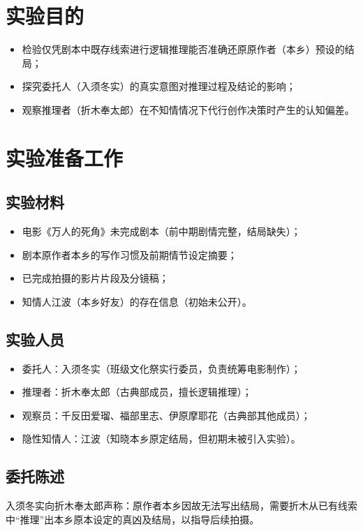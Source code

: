 \documentclass[a3paper, twocolumn]{article}
\begin{document}
\maketitle

\section{实验目的}
\begin{itemize}
    \item 检验仅凭剧本中既存线索进行逻辑推理能否准确还原原作者（本乡）预设的结局；
    \item 探究委托人（入须冬实）的真实意图对推理过程及结论的影响；
    \item 观察推理者（折木奉太郎）在不知情情况下代行创作决策时产生的认知偏差。
\end{itemize}

\section{实验准备工作}
\subsection{实验材料}
\begin{itemize}
    \item 电影《万人的死角》未完成剧本（前中期剧情完整，结局缺失）；
    \item 剧本原作者本乡的写作习惯及前期情节设定摘要；
    \item 已完成拍摄的影片片段及分镜稿；
    \item 知情人江波（本乡好友）的存在信息（初始未公开）。
\end{itemize}

\subsection{实验人员}
\begin{itemize}
    \item 委托人：入须冬实（班级文化祭实行委员，负责统筹电影制作）；
    \item 推理者：折木奉太郎（古典部成员，擅长逻辑推理）；
    \item 观察员：千反田爱瑠、福部里志、伊原摩耶花（古典部其他成员）；
    \item 隐性知情人：江波（知晓本乡原定结局，但初期未被引入实验）。
\end{itemize}

\subsection{委托陈述}
入须冬实向折木奉太郎声称：原作者本乡因故无法写出结局，需要折木从已有线索中“推理”出本乡原本设定的真凶及结局，以指导后续拍摄。
\end{document}
